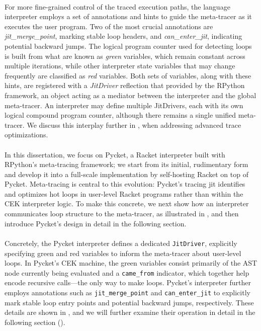         \paragraph{}%
            For more fine-grained control of the traced execution paths, the language interpreter employs a set of annotations and hints to guide the meta-tracer as it executes the user program. Two of the most crucial annotations are \emph{jit\_merge\_point}, marking stable loop headers, and \emph{can\_enter\_jit}, indicating potential backward jumps. The logical program counter used for detecting loops is built from what are known as \emph{green} variables, which remain constant across multiple iterations, while other interpreter state variables that may change frequently are classified as \emph{red} variables. Both sets of variables, along with these hints, are registered with a \emph{JitDriver} reflection that provided by the RPython framework, an object acting as a mediator between the interpreter and the global meta-tracer. An interpreter may define multiple JitDrivers, each with its own logical compound program counter, although there remains a single unified meta-tracer. We discuss this interplay further in , when addressing advanced trace optimizations.

        \paragraph{}%
            In this dissertation, we focus on Pycket, a Racket interpreter built with RPython's meta-tracing framework; we start from its initial, rudimentary form and develop it into a full-scale implementation by self-hosting Racket on top of Pycket. Meta-tracing is central to this evolution: Pycket's tracing \gls{jit} identifies and optimizes hot loops in user-level Racket programs rather than within the CEK interpreter logic. To make this concrete, we next show how an interpreter communicates loop structure to the meta-tracer, as illustrated in , and then introduce Pycket's design in detail in the following section.


        \paragraph{}%
            Concretely, the Pycket interpreter defines a dedicated \texttt{JitDriver}, explicitly specifying green and red variables to inform the meta-tracer about user-level loops. In Pycket’s CEK machine, the green variables consist primarily of the AST node currently being evaluated and a \texttt{came\_from} indicator, which together help encode recursive calls—the only way to make loops. Pycket’s interpreter further employs annotations such as \texttt{jit\_merge\_point} and \texttt{can\_enter\_jit} to explicitly mark stable loop entry points and potential backward jumps, respectively. These details are shown in , and we will further examine their operation in detail in the following section ().

